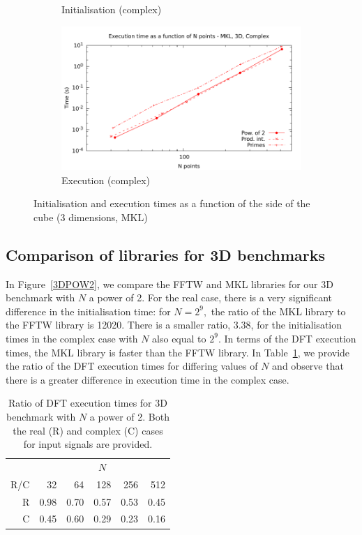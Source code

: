 \documentclass[12pt, a4paper]{article} \setlength{\textheight}{24cm}
\begin{document}
\begin{figure}[H]
\begin{subfigure}{.5\textwidth}
    \caption{Initialisation (complex)}
    \label{3DMKLCI}
  \end{subfigure}%
  \begin{subfigure}{.5\textwidth}
    \centering
    \includegraphics[width=.9\linewidth]{graphs/3d-mkl-exec-c.pdf}
    \caption{Execution (complex)}
    \label{3DMKLC}
  \end{subfigure}
  \caption{Initialisation and execution times as a function of the
    side of the cube (3 dimensions, MKL)}
  \label{3DMKL}
\end{figure}

\subsection{Comparison of libraries for 3D benchmarks}

In Figure~\ref{3DPOW2}, we compare the FFTW and MKL libraries for our
3D benchmark with $N$ a power of 2. For the real case, there is a very
significant difference in the initialisation time: for $N=2^9,$ the
ratio of the MKL library to the FFTW library is 12020. There is a
smaller ratio, 3.38, for the initialisation times in the complex case
with $N$ also equal to $2^9.$ In terms of the DFT execution times, the
MKL library is faster than the FFTW library. In
Table~\ref{Tbl:3DPOW2}, we provide the ratio of the DFT execution
times for differing values of $N$ and observe that there is a greater
difference in execution time in the complex case.

\begin{table}[H]
  \captionsetup{width=0.8\linewidth}
  \centering
  \begin{tabular}{|r|rrrrr|}
    \hline
    & \multicolumn{5}{|c|}{$N$ }   \\
    R/C & 32 & 64 & 128 & 256 & 512 \\
    \hline
    R & 0.98 & 0.70 & 0.57 & 0.53 & 0.45 \\
    C & 0.45 & 0.60 & 0.29 & 0.23 & 0.16 \\
    \hline
  \end{tabular}
  \caption{Ratio of DFT execution times for 3D benchmark with $N$ a power of 2. Both the real (R) and complex (C) cases for input signals are provided.}\label{Tbl:3DPOW2}
\end{table}
\end{document}
